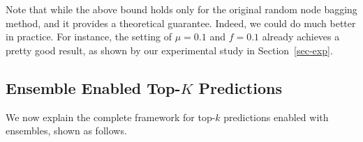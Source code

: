 Note that while the above bound holds only for the original random node bagging method, and it provides a theoretical guarantee.
Indeed, we could do much better in practice. For instance, the setting of $\mu = 0.1$ and $f = 0.1$ already achieves a pretty good result, as shown by our experimental study in Section~\ref{sec-exp}.

\subsection{Ensemble Enabled Top-$K$ Predictions}




We now explain the complete framework for top-$k$ predictions enabled with ensembles, shown as follows.

